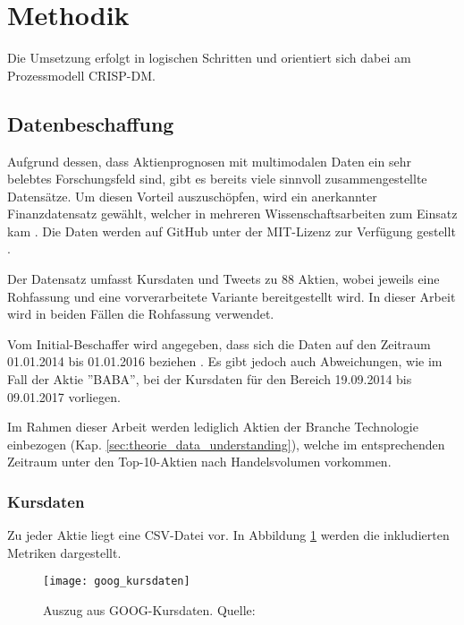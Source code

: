 \newpage
\section{Methodik}
Die Umsetzung erfolgt in logischen Schritten und orientiert sich dabei am Prozessmodell \ac{CRISP-DM}.  

\subsection{Datenbeschaffung}\label{sec:data_ingestion}
Aufgrund dessen, dass Aktienprognosen mit multimodalen Daten ein sehr belebtes Forschungsfeld sind, gibt es bereits viele sinnvoll zusammengestellte Datensätze. Um diesen Vorteil auszuschöpfen, wird ein anerkannter Finanzdatensatz gewählt, welcher in mehreren Wissenschaftsarbeiten zum Einsatz kam \autocite{xu2018StockMovement}\autocite{Xu2020StockMovement}\autocite{zhang2022transformer}. Die Daten werden auf GitHub unter der MIT-Lizenz zur Verfügung gestellt \autocite{website:stocknet-dataset}. 

Der Datensatz umfasst Kursdaten und Tweets zu 88 Aktien, wobei jeweils eine Rohfassung und eine vorverarbeitete Variante bereitgestellt wird. In dieser Arbeit wird in beiden Fällen die Rohfassung verwendet. 

Vom Initial-Beschaffer wird angegeben, dass sich die Daten auf den Zeitraum 01.01.2014 bis 01.01.2016 beziehen \autocite[Kap. 3]{xu2018StockMovement}.
Es gibt jedoch auch Abweichungen, wie im Fall der Aktie ''BABA'', bei der Kursdaten für den Bereich 19.09.2014 bis 09.01.2017 vorliegen.

Im Rahmen dieser Arbeit werden lediglich Aktien der Branche Technologie einbezogen (Kap. \ref{sec:theorie_data_understanding}), welche im entsprechenden Zeitraum unter den Top-10-Aktien nach Handelsvolumen vorkommen. 

\subsubsection*{Kursdaten}\label{sec:data_ingestion_stockdata}
Zu jeder Aktie liegt eine \ac{CSV}-Datei vor. In Abbildung \ref{fig:goog_kursdaten} werden die inkludierten Metriken dargestellt.
\newpage
\begin{figure}[H]
	\texttt{[image: goog\_kursdaten]}
	\caption[Auszug aus GOOG-Kursdaten]{Auszug aus GOOG-Kursdaten. Quelle: \autocite{website:stocknet-dataset}}
	\label{fig:goog_kursdaten}
\end{figure}
 

